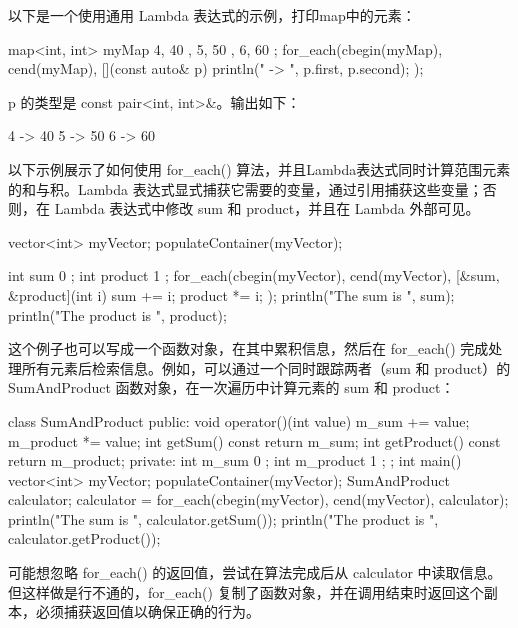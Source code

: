 
以下是一个使用通用 Lambda 表达式的示例，打印map中的元素：

\begin{cpp}
map<int, int> myMap { { 4, 40 }, { 5, 50 }, { 6, 60 } };
for_each(cbegin(myMap), cend(myMap), [](const auto& p)
    { println("{} -> {}", p.first, p.second); });
\end{cpp}

p 的类型是 const pair<int, int>\&。输出如下：

\begin{shell}
4 -> 40
5 -> 50
6 -> 60
\end{shell}

以下示例展示了如何使用 for\_each() 算法，并且Lambda表达式同时计算范围元素的和与积。Lambda 表达式显式捕获它需要的变量，通过引用捕获这些变量；否则，在 Lambda 表达式中修改 sum 和 product，并且在 Lambda 外部可见。

\begin{cpp}
vector<int> myVector;
populateContainer(myVector);

int sum { 0 };
int product { 1 };
for_each(cbegin(myVector), cend(myVector),
[&sum, &product](int i){
    sum += i;
    product *= i;
});
println("The sum is {}", sum);
println("The product is {}", product);
\end{cpp}

这个例子也可以写成一个函数对象，在其中累积信息，然后在 for\_each() 完成处理所有元素后检索信息。例如，可以通过一个同时跟踪两者（sum 和 product）的 SumAndProduct 函数对象，在一次遍历中计算元素的 sum 和 product：

\begin{cpp}
class SumAndProduct
{
    public:
        void operator()(int value)
        {
            m_sum += value;
            m_product *= value;
        }
        int getSum() const { return m_sum; }
        int getProduct() const { return m_product; }
    private:
        int m_sum { 0 };
        int m_product { 1 };
};
int main()
{
    vector<int> myVector;
    populateContainer(myVector);
    SumAndProduct calculator;
    calculator = for_each(cbegin(myVector), cend(myVector), calculator);
    println("The sum is {}", calculator.getSum());
    println("The product is {}", calculator.getProduct());
}
\end{cpp}

可能想忽略 for\_each() 的返回值，尝试在算法完成后从 calculator 中读取信息。但这样做是行不通的，for\_each() 复制了函数对象，并在调用结束时返回这个副本，必须捕获返回值以确保正确的行为。

